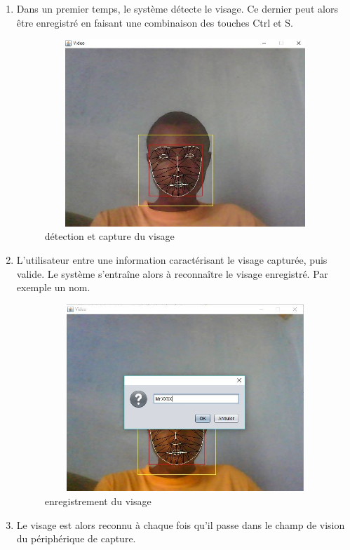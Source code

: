 	\begin{enumerate}
		\item Dans un premier temps, le système détecte le visage. Ce dernier peut alors être enregistré en faisant une combinaison des touches Ctrl et S.
		\begin{figure}[htbp]
		\centering
			\includegraphics[width=350pt,height=200pt]{track1.JPG}
		\caption{détection et capture du visage}
		\label{fig:track 1}
	\end{figure}
	\item L'utilisateur entre une information caractérisant le visage capturée, puis valide. Le système s'entraîne alors à reconnaître le visage enregistré. Par exemple un nom.
	\begin{figure}[htbp]
		\centering
			\includegraphics[width=350pt,height=200pt]{track2.JPG}
		\caption{enregistrement du visage}
		\label{fig:track 1}
	\end{figure}
	
	\item Le visage est alors reconnu à chaque fois qu'il passe dans le champ de vision du périphérique de capture.
	

\end{enumerate}
